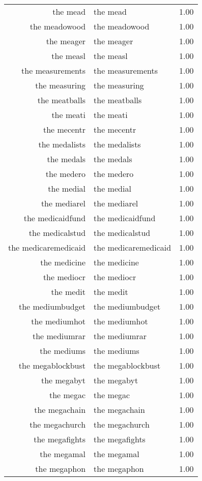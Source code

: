 \begin{table}[ht]
\begin{tabular}{rlr}
  the mead & the mead & 1.00 \\ 
  the meadowood & the meadowood & 1.00 \\ 
  the meager & the meager & 1.00 \\ 
  the measl & the measl & 1.00 \\ 
  the measurements & the measurements & 1.00 \\ 
  the measuring & the measuring & 1.00 \\ 
  the meatballs & the meatballs & 1.00 \\ 
  the meati & the meati & 1.00 \\ 
  the mecentr & the mecentr & 1.00 \\ 
  the medalists & the medalists & 1.00 \\ 
  the medals & the medals & 1.00 \\ 
  the medero & the medero & 1.00 \\ 
  the medial & the medial & 1.00 \\ 
  the mediarel & the mediarel & 1.00 \\ 
  the medicaidfund & the medicaidfund & 1.00 \\ 
  the medicalstud & the medicalstud & 1.00 \\ 
  the medicaremedicaid & the medicaremedicaid & 1.00 \\ 
  the medicine & the medicine & 1.00 \\ 
  the mediocr & the mediocr & 1.00 \\ 
  the medit & the medit & 1.00 \\ 
  the mediumbudget & the mediumbudget & 1.00 \\ 
  the mediumhot & the mediumhot & 1.00 \\ 
  the mediumrar & the mediumrar & 1.00 \\ 
  the mediums & the mediums & 1.00 \\ 
  the megablockbust & the megablockbust & 1.00 \\ 
  the megabyt & the megabyt & 1.00 \\ 
  the megac & the megac & 1.00 \\ 
  the megachain & the megachain & 1.00 \\ 
  the megachurch & the megachurch & 1.00 \\ 
  the megafights & the megafights & 1.00 \\ 
  the megamal & the megamal & 1.00 \\ 
  the megaphon & the megaphon & 1.00 \\ 

\end{tabular}
\end{table}
